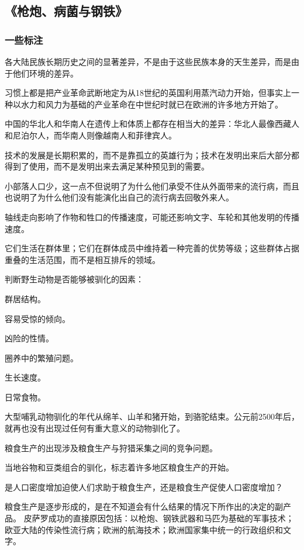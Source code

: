 \subsection{《枪炮、病菌与钢铁》}
\subsubsection{一些标注}
各大陆民族长期历史之间的显著差异，不是由于这些民族本身的天生差异，而是由于他们环境的差异。

习惯上都是把产业革命武断地定为从18世纪的英国利用蒸汽动力开始，但事实上一种以水力和风力为基础的产业革命在中世纪时就已在欧洲的许多地方开始了。

中国的华北人和华南人在遗传上和体质上都存在相当大的差异：华北人最像西藏人和尼泊尔人，而华南人则像越南人和菲律宾人。

技术的发展是长期积累的，而不是靠孤立的英雄行为；技术在发明出来后大部分都得到了使用，而不是发明出来去满足某种预见到的需要。

小部落人口少，这一点不但说明了为什么他们承受不住从外面带来的流行病，而且也说明了为什么他们没有能演化出自己的流行病去回敬外来人。

轴线走向影响了作物和牲口的传播速度，可能还影响文字、车轮和其他发明的传播速度。

它们生活在群体里；它们在群体成员中维持着一种完善的优势等级；这些群体占据重叠的生活范围，而不是相互排斥的领域。

判断野生动物是否能够被驯化的因素：
\begin{itemize*}
	\item 群居结构。
	\item 容易受惊的倾向。
	\item 凶险的性情。
	\item 圈养中的繁殖问题。
	\item 生长速度。
	\item 日常食物。
\end{itemize*}

大型哺乳动物驯化的年代从绵羊、山羊和猪开始，到骆驼结束。公元前2500年后，就再也没有出现过任何有重大意义的动物驯化了。

粮食生产的出现涉及粮食生产与狩猎采集之间的竞争问题。

当地谷物和豆类组合的驯化，标志着许多地区粮食生产的开始。

是人口密度增加迫使人们求助于粮食生产，还是粮食生产促使人口密度增加？

粮食生产是逐步形成的，是在不知道会有什么结果的情况下所作出的决定的副产品。
皮萨罗成功的直接原因包括：以枪炮、钢铁武器和马匹为基础的军事技术；欧亚大陆的传染性流行病；欧洲的航海技术；欧洲国家集中统一的行政组织和文字。

